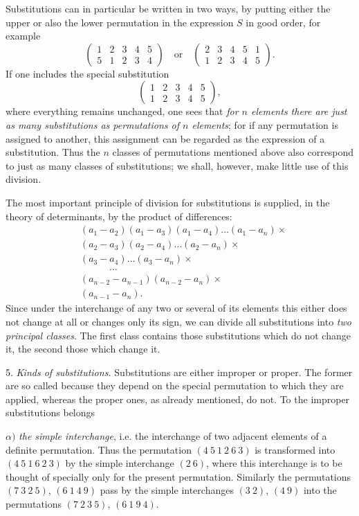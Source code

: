 \documentclass[10pt]{article}
\begin{document}
Substitutions can in particular be written in two ways, by putting either the upper or also the lower permutation in the expression \(S\) in good order, for example
\[
\begin{pmatrix}1&2&3&4&5\\5&1&2&3&4\end{pmatrix}
\quad\text{or}\quad
\begin{pmatrix}2&3&4&5&1\\1&2&3&4&5\end{pmatrix}.
\]
If one includes the special substitution
\[
\begin{pmatrix}1&2&3&4&5\\1&2&3&4&5\end{pmatrix},
\]
where everything remains unchanged, one sees that \emph{for \(n\) elements there are just as many substitutions as permutations of \(n\) elements}; for if any permutation is assigned to another, this assignment can be regarded as the expression of a substitution. Thus the \(n\) classes of permutations mentioned above also correspond to just as many classes of substitutions; we shall, however, make little use of this division.

The most important principle of division for substitutions is supplied, in the theory of determinants, by the product of differences:
\[
\begin{aligned}
&(a_1-a_2)(a_1-a_3)(a_1-a_4)\ldots(a_1-a_n)\times\\
&(a_2-a_3)(a_2-a_4)\ldots(a_2-a_n)\times\\
&(a_3-a_4)\ldots(a_3-a_n)\times\\
&\hspace{3em}\ldots\\
&(a_{n-2}-a_{n-1})(a_{n-2}-a_n)\times\\
&(a_{n-1}-a_n).
\end{aligned}
\]
Since under the interchange of any two or several of its elements this either does not change at all or changes only its sign, we can divide all substitutions into \emph{two principal classes}. The first class contains those substitutions which do not change it, the second those which change it.

5. \emph{Kinds of substitutions.} Substitutions are either improper or proper. The former are so called because they depend on the special permutation to which they are applied, whereas the proper ones, as already mentioned, do not. To the improper substitutions belongs

\(\alpha)\) \emph{the simple interchange}, i.e. the interchange of two adjacent elements of a definite permutation. Thus the permutation \((4\ 5\ 1\ 2\ 6\ 3)\) is transformed into \((4\ 5\ 1\ 6\ 2\ 3)\) by the simple interchange \((2\ 6)\), where this interchange is to be thought of specially only for the present permutation. Similarly the permutations \((7\ 3\ 2\ 5)\), \((6\ 1\ 4\ 9)\) pass by the simple interchanges \((3\ 2)\), \((4\ 9)\) into the permutations \((7\ 2\ 3\ 5)\), \((6\ 1\ 9\ 4)\).
\end{document}
